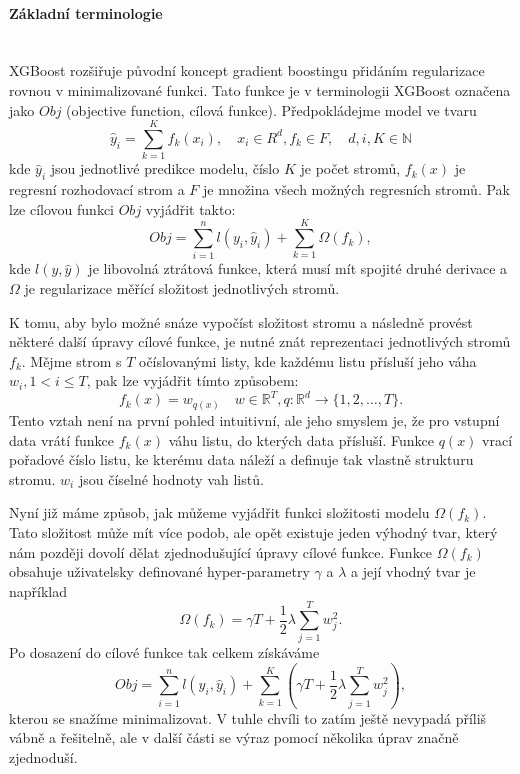 \documentclass[a4paper]{article}
\begin{document}
\paragraph{Základní terminologie} \mbox{} \\
XGBoost rozšiřuje původní koncept gradient boostingu přidáním regularizace rovnou v minimalizované funkci. Tato funkce je v terminologii XGBoost označena jako $Obj$ (objective function, cílová funkce). Předpokládejme model ve tvaru
    \begin{equation}
        \hat{y}_i = \sum\limits_{k=1}^K f_k(x_i), 
        \quad x_i \in R^d, f_k \in F, \quad d, i, K \in \mathbb{N}
    \end{equation}
 kde $\hat{y}_i$ jsou jednotlivé predikce modelu, číslo $K$ je počet stromů, $f_k(x)$ je regresní rozhodovací strom a $F$ je množina všech možných regresních stromů. Pak lze cílovou funkci $Obj$ vyjádřit takto:
    \begin{equation}
        Obj = \sum\limits_{i=1}^n l(y_i, \hat{y}_i) + \sum\limits_{k=1}^K\Omega (f_k),
    \end{equation}
kde $l(y, \hat{y})$ je libovolná ztrátová funkce, která musí mít spojité druhé derivace a $\Omega$ je regularizace měřící složitost jednotlivých stromů. 

K tomu, aby bylo možné snáze vypočíst složitost stromu a následně provést některé další úpravy cílové funkce, je nutné znát reprezentaci jednotlivých stromů $f_k$. Mějme strom s $T$ očíslovanými listy, kde každému listu přísluší jeho váha $w_i,  1<i \leq T $, pak lze vyjádřit tímto způsobem:
    \begin{equation}
      f_k(x) = w_{q(x)} \quad w \in \mathbb{R}^T, q: \mathbb{R}^d \rightarrow \{1,2, \dots, T \}.
    \end{equation}
Tento vztah není na první pohled intuitivní, ale jeho smyslem je, že pro vstupní data vrátí funkce $f_k(x)$ váhu listu, do kterých data přísluší. Funkce $q(x)$ vrací pořadové číslo listu, ke kterému data náleží a definuje tak vlastně strukturu stromu. $w_i$ jsou číselné hodnoty vah listů.

Nyní již máme způsob, jak můžeme vyjádřit funkci složitosti modelu $\Omega(f_k)$. Tato složitost může mít více podob, ale opět existuje jeden výhodný tvar, který nám později dovolí dělat zjednodušující úpravy cílové funkce. Funkce $\Omega(f_k)$ obsahuje uživatelsky definované hyper-parametry $\gamma$ a $\lambda$ a její vhodný tvar je například
    \begin{equation}\label{eq:eq15}
        \Omega(f_k) = \gamma T + \frac{1}{2} \lambda \sum \limits_{j=1}^T w_j^2.
    \end{equation}
Po dosazení do cílové funkce tak celkem získáváme 
    \begin{equation}
        Obj = \sum\limits_{i=1}^n l(y_i, \hat{y}_i) + \sum\limits_{k=1}^K \left( \gamma T + \frac{1}{2} \lambda \sum \limits_{j=1}^T w_j^2\right), 
    \end{equation}
kterou se snažíme minimalizovat. V tuhle chvíli to zatím ještě nevypadá příliš vábně a řešitelně, ale v další části se výraz pomocí několika úprav značně zjednoduší.
\end{document}
